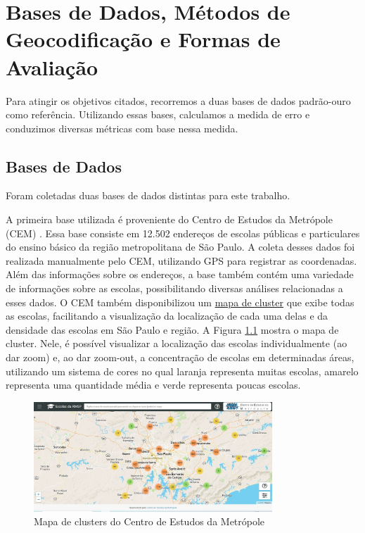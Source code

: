 \chapter{Bases de Dados, Métodos de Geocodificação e Formas de Avaliação} \label{desenvolvimento}

Para atingir os objetivos citados, recorremos a duas bases de dados padrão-ouro como referência. Utilizando essas bases, calculamos a medida de erro e conduzimos diversas métricas com base nessa medida.

\section{Bases de Dados}

Foram coletadas duas bases de dados distintas para este trabalho.

A primeira base utilizada é proveniente do Centro de Estudos da Metrópole (CEM) \cite{cem}. Essa base consiste em 12.502 endereços de escolas públicas e particulares do ensino básico da região metropolitana de São Paulo. A coleta desses dados foi realizada manualmente pelo CEM, utilizando GPS para registrar as coordenadas. Além das informações sobre os endereços, a base também contém uma variedade de informações sobre as escolas, possibilitando diversas análises relacionadas a esses dados. O CEM também disponibilizou um \href{http://200.144.244.241:3002/geolocation}{mapa de cluster} que exibe todas as escolas, facilitando a visualização da localização de cada uma delas e da densidade das escolas em São Paulo e região. A Figura \ref{fig:siteCEM} mostra o mapa de cluster. Nele, é possível visualizar a localização das escolas individualmente (ao dar zoom) e, ao dar zoom-out, a concentração de escolas em determinadas áreas, utilizando um sistema de cores no qual laranja representa muitas escolas, amarelo representa uma quantidade média e verde representa poucas escolas. 

\begin{figure} 
    \centering
    \includegraphics[width=0.8\textwidth]{Figuras/siteCEM.jpeg}
    \caption{Mapa de clusters do Centro de Estudos da Metrópole}
    \label{fig:siteCEM}
\end{figure} 

